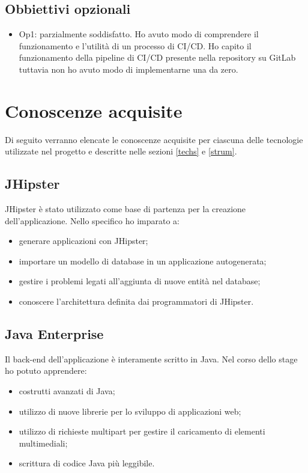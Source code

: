 \subsection{Obbiettivi opzionali}
\begin{itemize}
    \item Op1: parzialmente soddisfatto. Ho avuto modo di comprendere il funzionamento e l'utilità di un processo di CI/CD. Ho capito il funzionamento della pipeline di CI/CD presente nella repository su GitLab tuttavia non ho avuto modo di implementarne una da zero.
\end{itemize}

\section{Conoscenze acquisite}
Di seguito verranno elencate le conoscenze acquisite per ciascuna delle tecnologie utilizzate nel progetto e descritte nelle sezioni \ref{techs} e \ref{strum}.

\subsection{JHipster}
JHipster è stato utilizzato come base di partenza per la creazione dell'applicazione. Nello specifico ho imparato a:
\begin{itemize}
    \item generare applicazioni con JHipster;
    \item importare un modello di database in un applicazione autogenerata;
    \item gestire i problemi legati all'aggiunta di nuove entità nel database;
    \item conoscere l'architettura definita dai programmatori di JHipster.
\end{itemize}

\subsection{Java Enterprise}
Il back-end dell'applicazione è interamente scritto in Java. Nel corso dello stage ho potuto apprendere:
\begin{itemize}
    \item costrutti avanzati di Java;
    \item utilizzo di nuove librerie per lo sviluppo di applicazioni web;
    \item utilizzo di richieste multipart per gestire il caricamento di elementi multimediali;
    \item scrittura di codice Java più leggibile.
\end{itemize}

